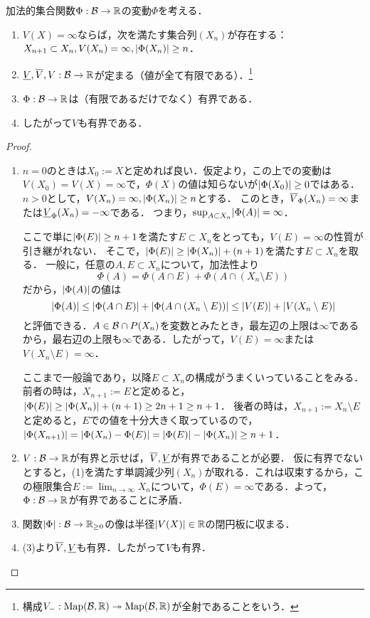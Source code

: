 \documentclass[uplatex, dvipdfmx]{jsreport}
\begin{document}
\begin{lemma}[変動は有界である]
    加法的集合関数$\Phi:\mathcal{B}\to\mathbb{R}$の変動$\Phi$を考える．
    \begin{enumerate}
        \item $V(X)=\infty$ならば，次を満たす集合列$(X_n)$が存在する：$X_{n+1}\subset X_n,V(X_n)=\infty,\lvert\Phi(X_n)\rvert\ge n$．
        \item $\underline{V},\overline{V},V:\mathcal{B}\to\mathbb{R}$が定まる（値が全て有限である）．\footnote{構成$V_-:\mathrm{Map}(\mathcal{B},\mathbb{R})\twoheadrightarrow\mathrm{Map}(\mathcal{B},\mathbb{R})$が全射であることをいう．}
        \item $\Phi:\mathcal{B}\to\mathbb{R}$は（有限であるだけでなく）有界である．
        \item したがって$V$も有界である．
    \end{enumerate}
\end{lemma}
\begin{proof}\mbox{}
    \begin{enumerate}
        \item $n=0$のときは$X_0:=X$と定めれば良い．仮定より，この上での変動は$V(X_0)=V(X)=\infty$で，$\Phi(X)$の値は知らないが$\lvert\Phi(X_0)\rvert\ge 0$ではある．
        $n>0$として，$V(X_n)=\infty,\lvert\Phi(X_n)\rvert\ge n$とする．
        このとき，$\overline{V}_\Phi(X_n)=\infty$または$\underline{V}_\Phi(X_n)=-\infty$である．
        つまり，$\sup_{A\subset X_n}\lvert\Phi(A)\rvert=\infty$．

        ここで単に$\lvert\Phi(E)\rvert\ge n+1$を満たす$E\subset X_n$をとっても，$V(E)=\infty$の性質が引き継がれない．
        そこで，$\lvert\Phi(E)\rvert\ge\lvert\Phi(X_n)\rvert+(n+1)$を満たす$E\subset X_n$を取る．
        一般に，任意の$A,E\subset X_n$について，加法性より
        \[\Phi(A)=\Phi(A\cap E)+\Phi(A\cap(X_n\setminus E))\]
        だから，$\lvert\Phi(A)\rvert$の値は
        \[\lvert\Phi(A)\rvert\le\lvert\Phi(A\cap E)\rvert+\lvert\Phi(A\cap(X_n\setminus E))\rvert\le\lvert V(E)\rvert+\lvert V(X_n\setminus E)\rvert\]
        と評価できる．$A\in\mathcal{B}\cap P(X_n)$を変数とみたとき，最左辺の上限は$\infty$であるから，最右辺の上限も$\infty$である．したがって，$V(E)=\infty$または$V(X_n\setminus E)=\infty$．
        
        ここまで一般論であり，以降$E\subset X_n$の構成がうまくいっていることをみる．
        前者の時は，$X_{n+1}:=E$と定めると，$\lvert\Phi(E)\rvert\ge\lvert\Phi(X_n)\rvert+(n+1)\ge 2n+1\ge n+1$．
        後者の時は，$X_{n+1}:=X_n\setminus E$と定めると，$E$での値を十分大きく取っているので，$\lvert\Phi(X_{n+1})\rvert=\lvert\Phi(X_n)-\Phi(E)\rvert=\lvert\Phi(E)\rvert-\lvert\Phi(X_n)\rvert\ge n+1$．
        \item $V:\mathcal{B}\to\mathbb{R}$が有界と示せば，$\overline{V},\underline{V}$が有界であることが必要．
        仮に有界でないとすると，(1)を満たす単調減少列$(X_n)$が取れる．これは収束するから，この極限集合$E:=\lim_{n\to\infty}X_n$について，$\Phi(E)=\infty$である．よって，$\Phi:\mathcal{B}\to\mathbb{R}$が有界であることに矛盾．
        \item 関数$\lvert\Phi\rvert:\mathcal{B}\to\mathbb{R}_{\ge 0}$の像は半径$\lvert V(X)\rvert\in\mathbb{R}$の閉円板に収まる．
        \item (3)より$\overline{V},\underline{V}$も有界．したがって$V$も有界．
    \end{enumerate}
\end{proof}
\end{document}
